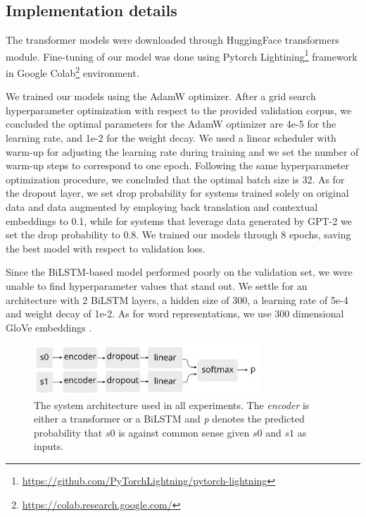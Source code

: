 \documentclass[10pt, a4paper]{article}
\begin{document}
\subsection{Implementation details}

The transformer models were downloaded through HuggingFace transformers \citep{wolf-etal-2020-transformers} module. Fine-tuning of our model was done using Pytorch Lightining\footnote{\href{https://github.com/PyTorchLightning/pytorch-lightning}{https://github.com/PyTorchLightning/pytorch-lightning}} framework in Google Colab\footnote{\href{https://colab.research.google.com/}{https://colab.research.google.com/}} environment.

We trained our models using the AdamW optimizer. After a grid search hyperparameter optimization with respect to the provided validation corpus, we concluded the optimal parameters for the AdamW optimizer are 4e-5 for the learning rate, and 1e-2 for the weight decay. We used a linear scheduler with warm-up for adjusting the learning rate during training and we set the number of warm-up steps to correspond to one epoch. Following the same hyperparameter optimization procedure, we concluded that the optimal batch size is 32. As for the dropout layer, we set drop probability for systems trained solely on original data and data augmented by employing back translation and contextual embeddings to 0.1, while for systems that leverage data generated by GPT-2 we set the drop probability to 0.8. We trained our models through 8 epochs, saving the best model with respect to validation loss.

Since the BiLSTM-based model performed poorly on the validation set, we were unable to find hyperparameter values that stand out. We settle for an architecture with 2 BiLSTM layers, a hidden size of 300, a learning rate of 5e-4 and weight decay of 1e-2. As for word representations, we use 300 dimensional GloVe embeddings \citep{pennington2014glove}.

\begin{figure} %
    \centering
    \includegraphics[width=8.5cm]{images/model14.jpg}
    \caption{The system architecture used in all experiments. The \textit{encoder} is either a transformer or a BiLSTM and \textit{p} denotes the predicted probability that $s0$ is against common sense given $s0$ and $s1$ as inputs.}
    \label{fig:model}
\end{figure}
\end{document}
